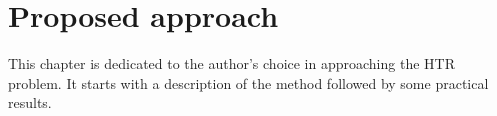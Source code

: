 \chapter{Proposed approach}
\label{chap:ch5}

This chapter is dedicated to the author's choice in approaching the HTR problem. It starts with a description of the method followed by some practical results.





